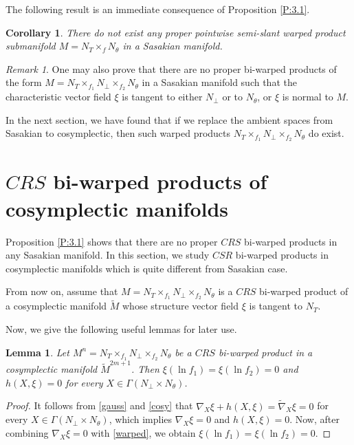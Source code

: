\documentclass[reqno]{amsart}
\theoremstyle{plain}
\newtheorem{lemma}{Lemma}[section]
\newtheorem{corollary}{Corollary}[section]
\theoremstyle{remark}
\newtheorem{remark}{Remark}[section]
\numberwithin{equation}{section}
\def\e{\eqref}
\def\e{\eqref}
\begin{document}
The following result is an immediate consequence of Proposition \ref{P:3.1}.
\begin{corollary}\label{C:3.1CS} There do not exist any proper pointwise semi-slant warped product submanifold $M=N_T\times_fN_\theta$ in a Sasakian manifold.
\end{corollary}

\begin{remark} One may also prove that there are no proper bi-warped products of the form $M=N_{T}\times_{f_{1}} N_{\perp}\times_{f_{2}} N_{\theta}$ in a Sasakian manifold such that the characteristic vector field $\xi$ is tangent to either $N_{\perp}$ or to $N_{\theta}$, or $\xi$ is normal to $M$.
\end{remark}

In the next section, we have found that if we replace the ambient  spaces from  Sasakian to cosymplectic, then such warped products  $N_T\times_{f_1}N_\perp\times_{f_2}N_\theta$ do exist.




\section{$CRS$ bi-warped products of cosymplectic manifolds}\label{S4}

Proposition \ref{P:3.1} shows that there are no proper $CRS$ bi-warped products in any Sasakian manifold. In this section, we study  $CSR$ bi-warped products in cosymplectic manifolds which is quite different from Sasakian case. 

From now on, assume that  $M=N_{T}\times_{f_1}N_\perp\times_{f_2}N_\theta$ is a $CRS$ bi-warped product of a cosymplectic manifold $\widetilde M$ whose structure vector field $\xi$ is tangent to $N_T$. 

Now, we give the following useful lemmas for later use.

\begin{lemma}\label{L:4.1} Let $M^n=N_T\times_{f_1}N_\perp\times_{f_2}N_\theta$ be a $CRS$ bi-warped product in a cosymplectic manifold $\widetilde M^{2m+1}$. Then $\xi(\ln f_1)=\xi(\ln f_2)=0$ and $h(X, \xi)=0$ for every $X\in \Gamma(N_{\perp}\times N_{\theta})$.
\end{lemma}
\begin{proof} It follows from  \e{gauss} and \e{cosy} that 
$\nabla_{X}\xi+h(X,\xi)=\widetilde \nabla_X {\xi}=0$ for every $X\in \Gamma(N_{\perp}\times N_{\theta})$, which implies $\nabla_{X}\xi=0$ and $h(X,\xi)=0$. Now, after combining $\nabla_{X}\xi=0$  with \e{warped}, we obtain $\xi(\ln f_1)=\xi(\ln f_2)=0$.
\end{proof}
\end{document}
